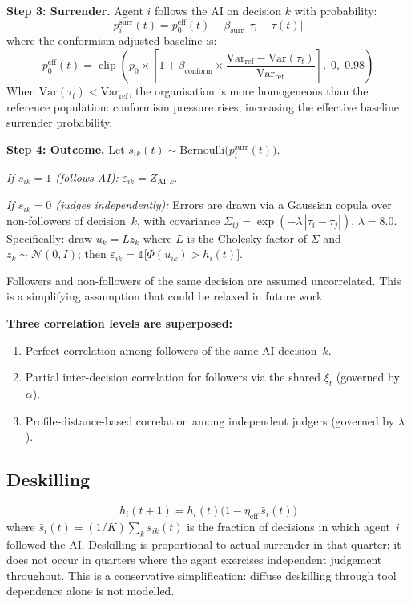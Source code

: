 \documentclass[11pt,a4paper]{article}
\newcommand{\ind}{\mathbb{1}}   %
\begin{document}
\begin{appendices}
\textbf{Step 3: Surrender.}
Agent $i$ follows the AI on decision $k$ with probability:
\[
  p_i^{\text{surr}}(t)
  = p_0^{\text{eff}}(t) - \beta_{\text{surr}}\,|\tau_i - \bar{\tau}(t)|
\]
where the conformism-adjusted baseline is:
\[
  p_0^{\text{eff}}(t)
  = \operatorname{clip}\!\left(
      p_0 \times \left[
        1 + \beta_{\text{conform}} \times
        \frac{\text{Var}_{\text{ref}} - \text{Var}(\tau_t)}
             {\text{Var}_{\text{ref}}}
      \right],\;0,\;0.98
    \right)
\]
When $\text{Var}(\tau_t) < \text{Var}_{\text{ref}}$, the organisation is
more homogeneous than the reference population: conformism pressure rises,
increasing the effective baseline surrender probability.

\textbf{Step 4: Outcome.}
Let $s_{ik}(t) \sim \mathrm{Bernoulli}\bigl(p_i^{\text{surr}}(t)\bigr)$.

\emph{If $s_{ik} = 1$ (follows AI):}
$\varepsilon_{ik} = Z_{\text{AI},k}$.

\emph{If $s_{ik} = 0$ (judges independently):}
Errors are drawn via a Gaussian copula over non-followers of decision~$k$,
with covariance $\Sigma_{ij} = \exp(-\lambda\,|\tau_i - \tau_j|)$,
$\lambda = 8.0$. Specifically: draw $u_k = Lz_k$ where $L$ is the Cholesky
factor of $\Sigma$ and $z_k \sim \mathcal{N}(0,I)$; then
$\varepsilon_{ik} = \ind\bigl[\Phi(u_{ik}) > h_i(t)\bigr]$.

Followers and non-followers of the same decision are assumed uncorrelated.
This is a simplifying assumption that could be relaxed in future work.

\medskip
\textbf{Three correlation levels are superposed:}
\begin{enumerate}[nosep, label=(\arabic*)]
  \item Perfect correlation among followers of the same AI decision~$k$.
  \item Partial inter-decision correlation for followers via the shared
        $\xi_t$ (governed by $\alpha$).
  \item Profile-distance-based correlation among independent judgers
        (governed by $\lambda$).
\end{enumerate}

\subsection{Deskilling}\label{app:model:deskilling}

\[
  h_i(t{+}1) = h_i(t)\bigl(1 - \eta_{\text{eff}}\,\bar{s}_i(t)\bigr)
\]
where $\bar{s}_i(t) = (1/K)\sum_k s_{ik}(t)$ is the fraction of decisions
in which agent~$i$ followed the AI. Deskilling is proportional to actual
surrender in that quarter; it does not occur in quarters where the agent
exercises independent judgement throughout. This is a conservative
simplification: diffuse deskilling through tool dependence alone is not
modelled.


\end{appendices}
\end{document}
